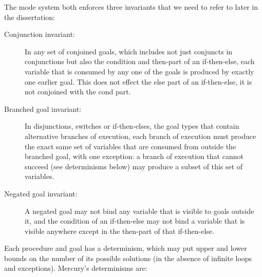 The mode system both enforces three invariants
that we need to refer to later in the dissertation:

\begin{description}

  \item[Conjunction invariant:]
  In any set of conjoined goals,
  which includes not just conjuncts in conjunctions
  but also the condition and then-part of an if-then-else,
  each variable that is consumed by any one of the goals
  is produced by exactly one earlier goal.
  This does not effect the else part of an if-then-else, it is not conjoined
  with the cond part.

  \item[Branched goal invariant:]
  In disjunctions, switches or if-then-elses,
  the goal types that contain alternative branches of execution,
  each branch of execution must produce
  the exact same set of variables
  that are consumed from outside the branched goal,
  with one exception:
  a branch of execution that cannot succeed (see determinisms below)
  may produce a subset of this set of variables.
  
  \item[Negated goal invariant:]
  A negated goal may not bind
  any variable that is visible to goals outside it,
  and the condition of an if-then-else may not bind a variable
  that is visible anywhere except in
  the then-part of that if-then-else.

\end{description}

\noindent
Each procedure and goal has a determinism,
which may put upper and lower bounds on the number of its possible solutions
(in the absence of infinite loops and exceptions).
Mercury's determinisms are:

